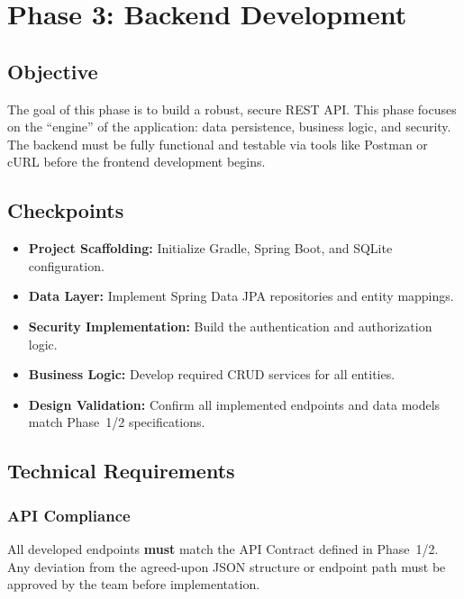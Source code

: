 

\section{Phase 3: Backend Development}\label{sec:phase3}

\subsection{Objective}
The goal of this phase is to build a robust, secure REST API. This phase focuses on the
``engine'' of the application: data persistence, business logic, and security. The backend
must be fully functional and testable via tools like Postman or cURL before the frontend development begins.

\subsection{Checkpoints}
\begin{itemize}
  \item[$\square$] \textbf{Project Scaffolding:} Initialize Gradle, Spring Boot, and SQLite configuration.
  \item[$\square$] \textbf{Data Layer:} Implement Spring Data JPA repositories and entity mappings.
  \item[$\square$] \textbf{Security Implementation:} Build the authentication and authorization logic.
  \item[$\square$] \textbf{Business Logic:} Develop required CRUD services for all entities.
  \item[$\square$] \textbf{Design Validation:} Confirm all implemented endpoints and data models match Phase~1/2 specifications.
\end{itemize}

\subsection{Technical Requirements}

\subsubsection{API Compliance}
All developed endpoints \textbf{must} match the API Contract defined in Phase~1/2. Any deviation from
the agreed-upon JSON structure or endpoint path must be approved by the team before implementation.


